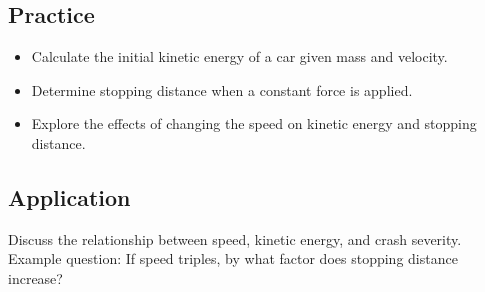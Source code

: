 \documentclass[11pt,addpoints,letterpaper]{exam}
\begin{document}
\subsection*{Practice}
\begin{itemize}
    \item Calculate the initial kinetic energy of a car given mass and velocity.
    \item Determine stopping distance when a constant force is applied.
    \item Explore the effects of changing the speed on kinetic energy and stopping distance.
\end{itemize}

\subsection*{Application}
Discuss the relationship between speed, kinetic energy, and crash severity. Example question: If speed triples, by what factor does stopping distance increase?
\end{document}
